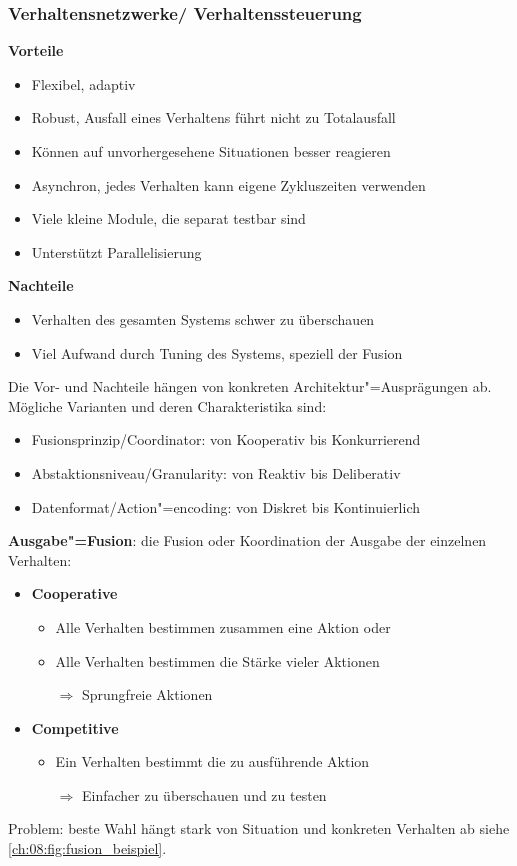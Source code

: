 \subsubsection{Verhaltensnetzwerke/ Verhaltenssteuerung}
\textbf{Vorteile}
\begin{itemize}
	\item Flexibel, adaptiv
	\item Robust, Ausfall eines Verhaltens führt nicht zu Totalausfall
	\item Können auf unvorhergesehene Situationen besser reagieren
	\item Asynchron, jedes Verhalten kann eigene Zykluszeiten verwenden
	\item Viele kleine Module, die separat testbar sind
	\item Unterstützt Parallelisierung
\end{itemize}
\textbf{Nachteile}
\begin{itemize}
	\item Verhalten des gesamten Systems schwer zu überschauen 
	\item Viel Aufwand durch Tuning des Systems, speziell der Fusion
\end{itemize}
Die Vor- und Nachteile hängen von konkreten Architektur"=Ausprägungen ab. Mögliche Varianten und deren Charakteristika sind:
\begin{itemize}
	\item Fusionsprinzip/Coordinator: von Kooperativ bis Konkurrierend
	\item Abstaktionsniveau/Granularity: von Reaktiv bis Deliberativ
	\item Datenformat/Action"=encoding: von Diskret bis Kontinuierlich
\end{itemize}

\textbf{Ausgabe"=Fusion}: die Fusion oder Koordination der Ausgabe der einzelnen Verhalten:
\begin{itemize}
	\item \textbf{Cooperative}
	\begin{itemize}
		\item Alle Verhalten bestimmen zusammen eine Aktion oder 
		\item Alle Verhalten bestimmen die Stärke vieler Aktionen 
		\item[$\Rightarrow$] Sprungfreie Aktionen
	\end{itemize}
	\item \textbf{Competitive}
	\begin{itemize}
		\item Ein Verhalten bestimmt die zu ausführende Aktion
		\item[$\Rightarrow$] Einfacher zu überschauen und zu testen
	\end{itemize}
\end{itemize}
Problem: beste Wahl hängt stark von Situation und konkreten Verhalten ab siehe \autoref{ch:08:fig:fusion_beispiel}.

